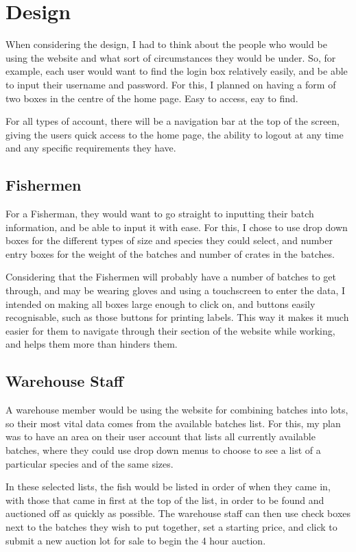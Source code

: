 \documentclass{article}
\begin{document}
\section{Design}
When considering the design, I had to think about the people who would be using the website and what sort of circumstances they would be under. So, for example, each user would want to find the login box relatively easily, and be able to input their username and password. For this, I planned on having a form of two boxes in the centre of the home page. Easy to access, eay to find.

For all types of account, there will be a navigation bar at the top of the screen, giving the users quick access to the home page, the ability to logout at any time and any specific requirements they have.

\subsection{Fishermen}

For a Fisherman, they would want to go straight to inputting their batch information, and be able to input it with ease. For this, I chose to use drop down boxes for the different types of size and species they could select, and number entry boxes for the weight of the batches and number of crates in the batches.

Considering that the Fishermen will probably have a number of batches to get through, and may be wearing gloves and using a touchscreen to enter the data, I intended on making all boxes large enough to click on, and buttons easily recognisable, such as those buttons for printing labels. This way it makes it much easier for them to navigate through their section of the website while working, and helps them more than hinders them.

\subsection{Warehouse Staff}

A warehouse member would be using the website for combining batches into lots, so their most vital data comes from the available batches list. For this, my plan was to have an area on their user account that lists all currently available batches, where they could use drop down menus to choose to see a list of a particular species and of the same sizes.

In these selected lists, the fish would be listed in order of when they came in, with those that came in first at the top of the list, in order to be found and auctioned off as quickly as possible. The warehouse staff can then use check boxes next to the batches they wish to put together, set a starting price, and click to submit a new auction lot for sale to begin the 4 hour auction.
\end{document}
